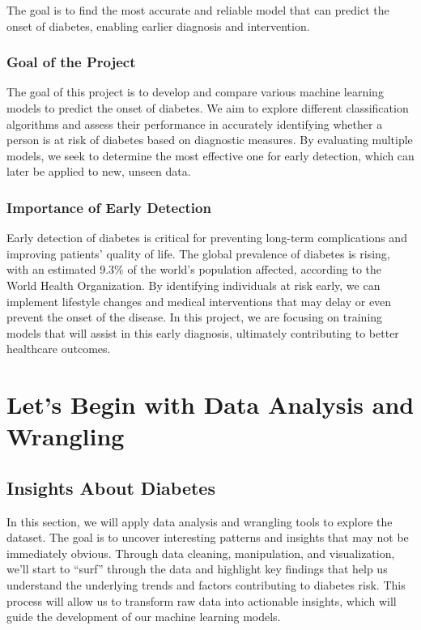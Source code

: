 \documentclass[
]{article}
\begin{document}
The goal is to find the most accurate and reliable model that can
predict the onset of diabetes, enabling earlier diagnosis and
intervention.

\subsubsection{Goal of the Project}\label{goal-of-the-project}

The goal of this project is to develop and compare various machine
learning models to predict the onset of diabetes. We aim to explore
different classification algorithms and assess their performance in
accurately identifying whether a person is at risk of diabetes based on
diagnostic measures. By evaluating multiple models, we seek to determine
the most effective one for early detection, which can later be applied
to new, unseen data.

\subsubsection{Importance of Early
Detection}\label{importance-of-early-detection}

Early detection of diabetes is critical for preventing long-term
complications and improving patients' quality of life. The global
prevalence of diabetes is rising, with an estimated 9.3\% of the world's
population affected, according to the World Health Organization. By
identifying individuals at risk early, we can implement lifestyle
changes and medical interventions that may delay or even prevent the
onset of the disease. In this project, we are focusing on training
models that will assist in this early diagnosis, ultimately contributing
to better healthcare outcomes.

\section{Let's Begin with Data Analysis and
Wrangling}\label{lets-begin-with-data-analysis-and-wrangling}

\subsection{Insights About Diabetes}\label{insights-about-diabetes}

In this section, we will apply data analysis and wrangling tools to
explore the dataset. The goal is to uncover interesting patterns and
insights that may not be immediately obvious. Through data cleaning,
manipulation, and visualization, we'll start to ``surf'' through the
data and highlight key findings that help us understand the underlying
trends and factors contributing to diabetes risk. This process will
allow us to transform raw data into actionable insights, which will
guide the development of our machine learning models.
\end{document}
